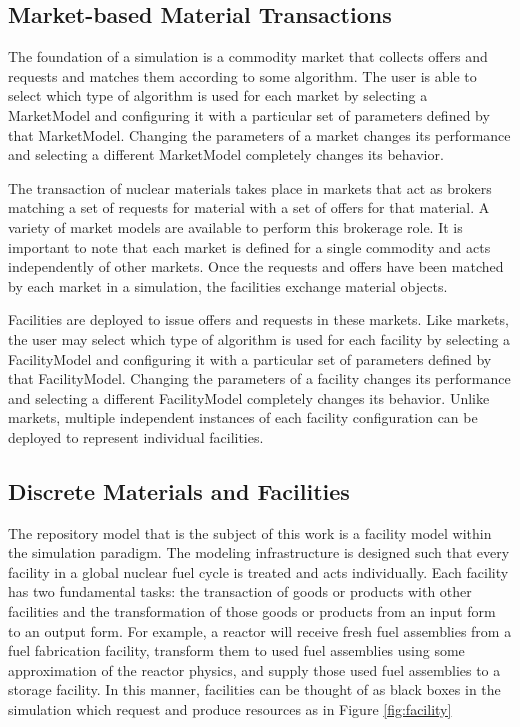 \subsection{Market-based Material Transactions}

The foundation of a simulation is a commodity market that collects 
offers and requests and matches them according to some algorithm.  The 
user is able to select which type of algorithm is used for each market 
by selecting a MarketModel and configuring it with a particular set of 
parameters defined by that MarketModel.  Changing the parameters of a 
market changes its performance and selecting a different MarketModel 
completely changes its behavior.

The transaction of nuclear materials takes place in markets that act
as brokers matching a set of requests for material with a set of
offers for that material. A variety of market models are available
to perform this brokerage role. It is important to note that each
market is defined for a single commodity and acts independently of
other markets. Once the requests and offers have been matched by each
market in a simulation, the facilities exchange material objects.

Facilities are deployed to issue offers and requests in these markets.  
Like markets, the user may select which type of algorithm is used for 
each facility by selecting a FacilityModel and configuring it with a 
particular set of parameters defined by that FacilityModel.  Changing 
the parameters of a facility changes its performance and selecting a 
different FacilityModel completely changes its behavior.  Unlike 
markets, multiple independent instances of each facility configuration 
can be deployed to represent individual facilities.


\subsection{Discrete Materials and Facilities}

The repository model that is the subject of this work is a facility model 
within the \Cyclus simulation paradigm.  The \Cyclus modeling infrastructure is 
designed such that every facility in a global nuclear fuel cycle is treated and 
acts individually.  Each facility has two fundamental tasks: the transaction of 
goods or products with other facilities and the transformation of those goods 
or products from an input form to an output form.  For example, a reactor will 
receive fresh fuel assemblies from a fuel fabrication facility, transform them 
to used fuel assemblies using some approximation of the reactor physics, and 
supply those used fuel assemblies to a storage facility. In this manner, 
facilities can be thought of as black boxes in the simulation which request and 
produce resources as in Figure \ref{fig:facility} 

